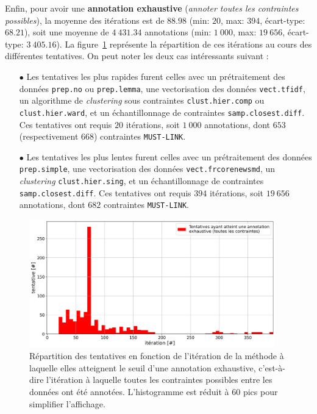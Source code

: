 			Enfin, pour avoir une \textbf{annotation exhaustive} (\textit{annoter toutes les contraintes possibles}), la moyenne des itérations est de $88.98$ (min: $20$, max: $394$, écart-type: $68.21$), soit une moyenne de $4~431.34$ annotations (min: $1~000$, max: $19~656$, écart-type: $3~405.16$).
			La figure~\ref{figure:4.2.1-ETUDE-OPTIMISATION-HISTOGRAMME-ANNOTATION-EXHAUSTIVE} représente la répartition de ces itérations au cours des différentes tentatives.
			On peut noter les deux cas intéressants suivant :
			\begin{itemize}
				\item[$\bullet$] Les tentatives les plus rapides furent celles avec un prétraitement des données \texttt{prep.no} ou \texttt{prep.lemma}, une vectorisation des données \texttt{vect.tfidf}, un algorithme de \textit{clustering} sous contraintes \texttt{clust.hier.comp} ou \texttt{clust.hier.ward}, et un échantillonnage de contraintes \texttt{samp.closest.diff}. Ces tentatives ont requis $20$ itérations, soit $1~000$ annotations, dont $653$ (respectivement $668$) contraintes \texttt{MUST-LINK}.
				\item[$\bullet$] Les tentatives les plus lentes furent celles avec un prétraitement des données \texttt{prep.simple}, une vectorisation des données \texttt{vect.frcorenewsmd}, un \textit{clustering} \texttt{clust.hier.sing}, et un échantillonnage de contraintes \texttt{samp.closest.diff}. Ces tentatives ont requis $394$ itérations, soit $19~656$ annotations, dont $682$ contraintes \texttt{MUST-LINK}.
			\end{itemize}
			\begin{figure}[!htb]
				\centering
				\includegraphics[width=0.95\textwidth]{figures/etude-efficience-histogramme-annotation-exhaustive}
				\caption{Répartition des tentatives en fonction de l'itération de la méthode à laquelle elles atteignent le seuil d'une annotation exhaustive, c'est-à-dire l'itération à laquelle toutes les contraintes possibles entre les données ont été annotées. L'histogramme est réduit à $60$ pics pour simplifier l'affichage.}
				\label{figure:4.2.1-ETUDE-OPTIMISATION-HISTOGRAMME-ANNOTATION-EXHAUSTIVE}
			\end{figure}
